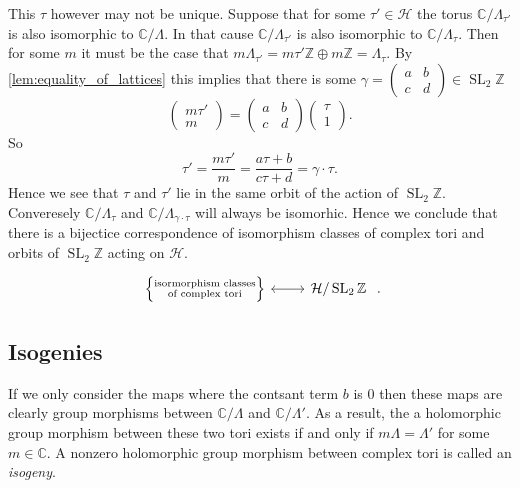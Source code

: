 \documentclass[a4paper]{article}
\theoremstyle{theoremdd}
\theoremstyle{definitiondd}
\theoremstyle{remarkdd}
\newcommand{\Z}{\mathbb{Z}}
\newcommand{\C}{\mathbb{C}}
\DeclareMathOperator{\SL}{SL}
\begin{document}
This $\tau$ however may not be unique. Suppose that for some $\tau' \in \mathcal{H} $ the torus $\C / \Lambda_{\tau'}$ is also isomorphic to $\C / \Lambda$. In that cause $\C / \Lambda_{\tau'}$ is also isomorphic to $\C / \Lambda_{\tau}$. 
Then for some $m$ it must be the case that $m \Lambda_{\tau'} = m\tau' \Z \oplus m \Z = \Lambda_\tau$. 
By \cref{lem:equality_of_lattices} this implies that there is some $\gamma = \begin{pmatrix} a & b \\ c& d \end{pmatrix}  \in \SL_2\Z$ \[
\begin{pmatrix} m\tau' \\ m \end{pmatrix}  = \begin{pmatrix} a & b \\ c& d \end{pmatrix}  \begin{pmatrix} \tau \\ 1 \end{pmatrix} 
.\] 
So \[
\tau' = \frac{m \tau'}{m} = \frac{a \tau + b}{c \tau + d} = \gamma\cdot \tau
.\] 
Hence we see that $\tau$ and $\tau'$ lie in the same orbit of the action of $\SL_2\Z$. 
Converesely $\C / \Lambda_\tau$ and $\C / \Lambda_{\gamma\cdot \tau}$ will always be isomorhic.
Hence we conclude that there is a bijectice correspondence of isomorphism classes of complex tori and orbits of $\SL_2\Z$ acting on $\mathcal{H} $.\[
\begin{tikzcd}
	\left\{ \substack{\text{isormorphism classes} \\ \text{of complex tori}} \right\} \arrow[r, leftrightarrow] & 
	\mathcal{H} / \SL_2\Z\ 
\end{tikzcd}
.\] 
\subsection{Isogenies}
If we only consider the maps where the contsant term $b$ is $0$ then these maps are clearly group morphisms between $\C / \Lambda$ and  $\C / \Lambda'$. 
As a result, the a holomorphic group morphism between these two tori exists if and only if $m\Lambda = \Lambda'$ for some $m \in \C$. 
A nonzero holomorphic group morphism between complex tori is called an \emph{isogeny}.
\end{document}
